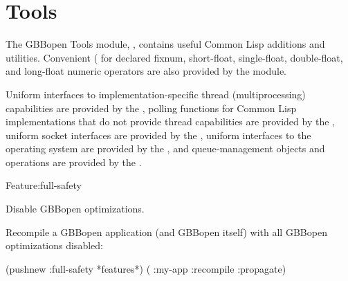 \documentclass[10pt,twoside,english,pdftex]{article}
\begin{document}

\T\markright{}%
\T\pagestyle{plain}
\T\cleardoublepage
\W{}
\T\pagestyle{fancy}
\T\thispagestyle{fancybottom}
\T\global\def\fnlastname{ }%
\T\renewcommand{\headrulewidth}{0pt}
\section{Tools}

%
%
The GBBopen Tools module, , contains useful
Common Lisp additions and utilities.  Convenient ( for declared fixnum, short-float,
single-float, double-float, and long-float numeric operators are also
provided by the  module.

Uniform interfaces to implementation-specific thread (multiprocessing)
capabilities are provided by the , polling functions for Common Lisp
implementations that do not provide thread capabilities are
provided by the , uniform socket interfaces are
provided by the , uniform interfaces to the operating
system are provided by the , and queue-management objects and
operations are provided by the .

\W\entities
\T\clearpage
\T\renewcommand{\headrulewidth}{0.01pt}


\begin{functiondoc}{Feature}{:full-safety}{}%
%
%
%

\fnsyntax

\fnpurpose Disable GBBopen optimizations.

\fnexample
{}%
%
%
Recompile a GBBopen application (and GBBopen itself) with all GBBopen
optimizations disabled:
\begin{example}
  (pushnew :full-safety *features*)
  ( :my-app :recompile :propagate)
\end{example}

\end{functiondoc}
\end{document}
